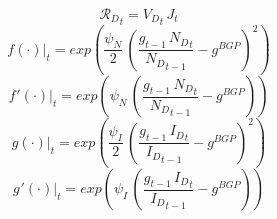 \documentclass[10pt,a4paper]{article}
\begin{document}
\begin{dmath}
{\mathcal{R}_{D}}_{t}={V_D}_{t}\, {J}_{t}
\end{dmath}
\begin{dmath}
{\left.       f\left( \cdot \right)            \right|}_{t}=exp\left(\frac{\psi_N}{2}\, \left(\frac{{g}_{t-1}\, {N_D}_{t}}{{N_D}_{t-1}}-g^{BGP}\right)^{2}\right)
\end{dmath}
\begin{dmath}
{\left.       f^‎{\prime}\left( \cdot \right)   \right|}_{t}=exp\left(\psi_N\, \left(\frac{{g}_{t-1}\, {N_D}_{t}}{{N_D}_{t-1}}-g^{BGP}\right)\right)
\end{dmath}
\begin{dmath}
{\left.       g\left( \cdot \right)            \right|}_{t}=exp\left(\frac{\psi_I}{2}\, \left(\frac{{g}_{t-1}\, {I_D}_{t}}{{I_D}_{t-1}}-g^{BGP}\right)^{2}\right)
\end{dmath}
\begin{dmath}
{\left.       g^‎{\prime}\left( \cdot \right)   \right|}_{t}=exp\left(\psi_I\, \left(\frac{{g}_{t-1}\, {I_D}_{t}}{{I_D}_{t-1}}-g^{BGP}\right)\right)
\end{dmath}
\end{document}
